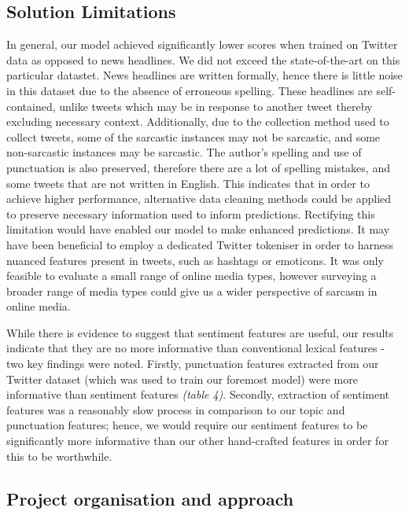 \documentclass[12pt,a4paper]{article}
\begin{document}
\subsection{Solution Limitations}\vspace{-10pt}
In general, our model achieved significantly lower scores when trained on Twitter data as opposed to news headlines. We did not exceed the state-of-the-art on this particular datastet. News headlines are written formally, hence there is little noise in this dataset due to the absence of erroneous spelling. These headlines are self-contained, unlike tweets which may be in response to another tweet thereby excluding necessary context. Additionally, due to the collection method used to collect tweets, some of the sarcastic instances may not be sarcastic, and some non-sarcastic instances may be sarcastic. The author's spelling and use of punctuation is also preserved, therefore there are a lot of spelling mistakes, and some tweets that are not written in English. This indicates that in order to achieve higher performance, alternative data cleaning methods could be applied to preserve necessary information used to inform predictions. Rectifying this limitation would have enabled our model to make enhanced predictions. It may have been beneficial to employ a dedicated Twitter tokeniser in order to harness nuanced features present in tweets, such as hashtags or emoticons. It was only feasible to evaluate a small range of online media types, however surveying a broader range of media types could give us a wider perspective of sarcasm in online media.

While there is evidence to suggest that sentiment features are useful, our results indicate that they are no more informative than conventional lexical features - two key findings were noted. Firstly, punctuation features extracted from our Twitter dataset (which was used to train our foremost model) were more informative than sentiment features \textit{(table 4)}. Secondly, extraction of sentiment features was a reasonably slow process in comparison to our topic and punctuation features; hence, we would require our sentiment features to be significantly more informative than our other hand-crafted features in order for this to be worthwhile.







\subsection{Project organisation and approach}\vspace{-10pt}
\end{document}

